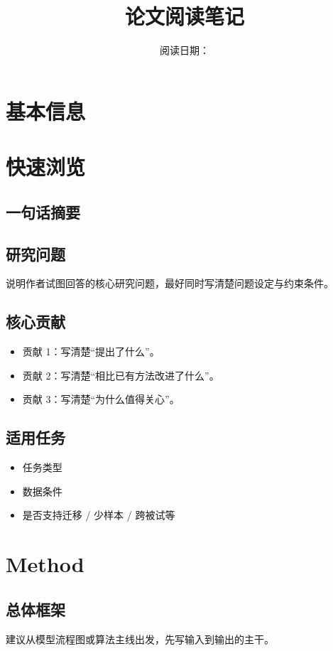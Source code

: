 \documentclass[UTF8,fontset=fandol,zihao=-4]{ctexart}
\title{\papertitle\\\large 论文阅读笔记}
\author{\paperauthors}
\date{阅读日期：\readingdate}
\begin{document}
\maketitle

\section{基本信息}

\RenderBasicInfoTable

\section{快速浏览}

\subsection{一句话摘要}
\paperonesentence

\subsection{研究问题}
说明作者试图回答的核心研究问题，最好同时写清楚问题设定与约束条件。

\subsection{核心贡献}
\begin{itemize}
  \item 贡献 1：写清楚“提出了什么”。
  \item 贡献 2：写清楚“相比已有方法改进了什么”。
  \item 贡献 3：写清楚“为什么值得关心”。
\end{itemize}

\subsection{适用任务}
\begin{itemize}
  \item 任务类型
  \item 数据条件
  \item 是否支持迁移 / 少样本 / 跨被试等
\end{itemize}

\section{Method}

\subsection{总体框架}
建议从模型流程图或算法主线出发，先写输入到输出的主干。
\end{document}
